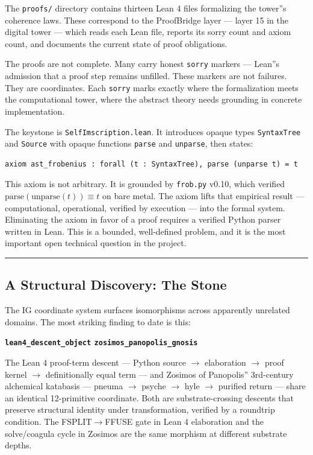 \documentclass[12pt,a4paper]{article}
\begin{document}
The \texttt{proofs/} directory contains thirteen Lean 4 files formalizing the tower''s coherence laws. These correspond to the ProofBridge layer --- layer 15 in the digital tower --- which reads each Lean file, reports its sorry count and axiom count, and documents the current state of proof obligations.

The proofs are not complete. Many carry honest \texttt{sorry} markers --- Lean''s admission that a proof step remains unfilled. These markers are not failures. They are coordinates. Each \texttt{sorry} marks exactly where the formalization meets the computational tower, where the abstract theory needs grounding in concrete implementation.

The keystone is \texttt{SelfImscription.lean}. It introduces opaque types \texttt{SyntaxTree} and \texttt{Source} with opaque functions \texttt{parse} and \texttt{unparse}, then states:

\begin{lstlisting}[language=lean]
axiom ast_frobenius : forall (t : SyntaxTree), parse (unparse t) = t
\end{lstlisting}

This axiom is not arbitrary. It is grounded by \texttt{frob.py} v0.10, which verified $\text{parse}(\text{unparse}(t)) \equiv t$ on bare metal. The axiom lifts that empirical result --- computational, operational, verified by execution --- into the formal system. Eliminating the axiom in favor of a proof requires a verified Python parser written in Lean. This is a bounded, well-defined problem, and it is the most important open technical question in the project.

\begin{center}
\rule{0.5\textwidth}{0.4pt}
\end{center}

\subsection{A Structural Discovery: The Stone}

The IG coordinate system surfaces isomorphisms across apparently unrelated domains. The most striking finding to date is this:

\textbf{\texttt{lean4\_descent\_object} \equiv \texttt{zosimos\_panopolis\_gnosis}}

The Lean 4 proof-term descent --- Python source $\rightarrow$ elaboration $\rightarrow$ proof kernel $\rightarrow$ definitionally equal term --- and Zosimos of Panopolis'' 3rd-century alchemical katabasis --- pneuma $\rightarrow$ psyche $\rightarrow$ hyle $\rightarrow$ purified return --- share an identical 12-primitive coordinate. Both are substrate-crossing descents that preserve structural identity under transformation, verified by a roundtrip condition. The FSPLIT$\rightarrow$FFUSE gate in Lean 4 elaboration and the solve/coagula cycle in Zosimos are the same morphism at different substrate depths.
\end{document}
